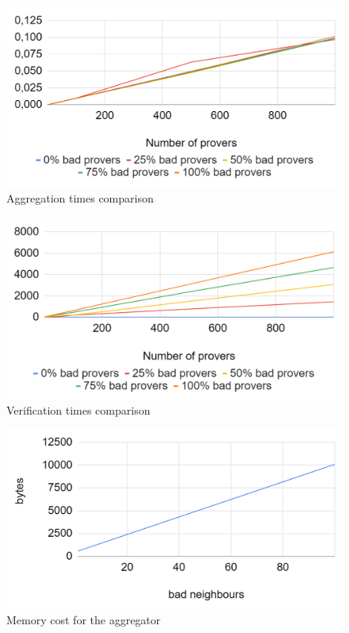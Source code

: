 \begin{figure}
  \centering
  \includegraphics[width=.80\linewidth]{Images/aggregation.png}  
  \caption{Aggregation times comparison}
  \label{fig:aggregation_comparison}
\end{figure}
\begin{figure}
  \centering
  \includegraphics[width=.80\linewidth]{Images/verification.png}  
  \caption{Verification times comparison}
  \label{fig:verification_comparison}
\end{figure}
\begin{figure}
  \centering
  \includegraphics[width=.80\linewidth]{Images/memory_cost.png} 
  \caption{Memory cost for the aggregator} 
  \label{fig:memory_cost}
\end{figure}
